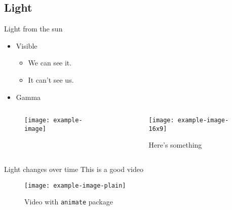 
\subsection{Light}

\begin{frame}{Light from the sun}
\begin{itemize}
    \item Visible
    \begin{itemize}
        \item We can see it.
        \item It can't see us.
    \end{itemize}
    \smallskip
    \item Gamma
\end{itemize}
\begin{columns}[T]
\begin{column}{0.5\linewidth}
\begin{figure}
    \centering
    \texttt{[image: example-image]}
    \caption{\cite{scholes2011lessons}}
\end{figure}
\end{column}
\begin{column}{0.5\linewidth}
\begin{figure}
    \centering
    \texttt{[image: example-image-16x9]}
    \caption{Here's something}
\end{figure}
\end{column}
\end{columns}
\end{frame}

\begin{frame}{Light changes over time}
\centering
This is a good video
\smallskip

\begin{figure}
    \centering
    \texttt{[image: example-image-plain]}
    \caption{Video with \lstinline{animate} package}
\end{figure}
\end{frame}

